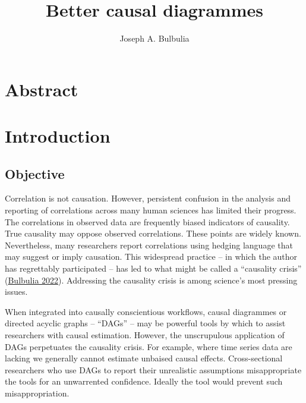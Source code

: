 \documentclass[
  singlecolumn]{report}
\title{Better causal diagrammes}
\author{Joseph A. Bulbulia}
\date{}
\begin{document}
\maketitle
\ifdefined\Shaded\renewenvironment{Shaded}{\begin{tcolorbox}[boxrule=0pt, frame hidden, breakable, borderline west={3pt}{0pt}{shadecolor}, interior hidden, enhanced, sharp corners]}{\end{tcolorbox}}\fi

\listoffigures
\listoftables
\hypertarget{abstract}{%
\section{Abstract}\label{abstract}}

\hypertarget{introduction}{%
\section{Introduction}\label{introduction}}

\hypertarget{objective}{%
\subsection{Objective}\label{objective}}

Correlation is not causation. However, persistent confusion in the
analysis and reporting of correlations across many human sciences has
limited their progress. The correlations in observed data are frequently
biased indicators of causality. True causality may oppose observed
correlations. These points are widely known. Nevertheless, many
researchers report correlations using hedging language that may suggest
or imply causation. This widespread practice -- in which the author has
regrettably participated -- has led to what might be called a
``causality crisis'' (\protect\hyperlink{ref-bulbulia2022}{Bulbulia
2022}). Addressing the causality crisis is among science's most pressing
issues.

When integrated into causally conscientious workflows, causal diagrammes
or directed acyclic graphs -- ``DAGs'' -- may be powerful tools by which
to assist researchers with causal estimation. However, the unscrupulous
application of DAGs perpetuates the causality crisis. For example, where
time series data are lacking we generally cannot estimate unbaised
causal effects. Cross-sectional researchers who use DAGs to report their
unrealistic assumptions misappropriate the tools for an unwarrented
confidence. Ideally the tool would prevent such misappropriation.
\end{document}
